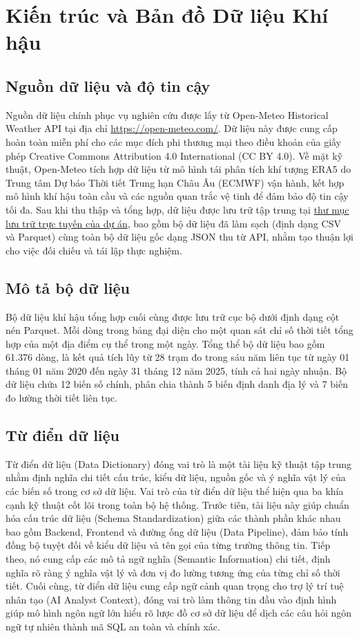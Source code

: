 \chapter{Kiến trúc và Bản đồ Dữ liệu Khí hậu}

\section{Nguồn dữ liệu và độ tin cậy}
Nguồn dữ liệu chính phục vụ nghiên cứu được lấy từ Open-Meteo Historical Weather API tại địa chỉ \url{https://open-meteo.com/}. Dữ liệu này được cung cấp hoàn toàn miễn phí cho các mục đích phi thương mại theo điều khoản của giấy phép Creative Commons Attribution 4.0 International (CC BY 4.0). Về mặt kỹ thuật, Open-Meteo tích hợp dữ liệu từ mô hình tái phân tích khí tượng ERA5 do Trung tâm Dự báo Thời tiết Trung hạn Châu Âu (ECMWF) vận hành, kết hợp mô hình khí hậu toàn cầu và các nguồn quan trắc vệ tinh để đảm bảo độ tin cậy tối đa. Sau khi thu thập và tổng hợp, dữ liệu được lưu trữ tập trung tại \href{https://drive.google.com/drive/folders/1CctfwMHv8zrezlzuVUq7foVr1sAQaxJL}{thư mục lưu trữ trực tuyến của dự án}, bao gồm bộ dữ liệu đã làm sạch (định dạng CSV và Parquet) cùng toàn bộ dữ liệu gốc dạng JSON thu từ API, nhằm tạo thuận lợi cho việc đối chiếu và tái lập thực nghiệm.

\section{Mô tả bộ dữ liệu}
Bộ dữ liệu khí hậu tổng hợp cuối cùng được lưu trữ cục bộ dưới định dạng cột nén Parquet. Mỗi dòng trong bảng đại diện cho một quan sát chỉ số thời tiết tổng hợp của một địa điểm cụ thể trong một ngày. Tổng thể bộ dữ liệu bao gồm 61.376 dòng, là kết quả tích lũy từ 28 trạm đo trong sáu năm liên tục từ ngày 01 tháng 01 năm 2020 đến ngày 31 tháng 12 năm 2025, tính cả hai ngày nhuận. Bộ dữ liệu chứa 12 biến số chính, phân chia thành 5 biến định danh địa lý và 7 biến đo lường thời tiết liên tục.

\section{Từ điển dữ liệu}
Từ điển dữ liệu (Data Dictionary) đóng vai trò là một tài liệu kỹ thuật tập trung nhằm định nghĩa chi tiết cấu trúc, kiểu dữ liệu, nguồn gốc và ý nghĩa vật lý của các biến số trong cơ sở dữ liệu. Vai trò của từ điển dữ liệu thể hiện qua ba khía cạnh kỹ thuật cốt lõi trong toàn bộ hệ thống. Trước tiên, tài liệu này giúp chuẩn hóa cấu trúc dữ liệu (Schema Standardization) giữa các thành phần khác nhau bao gồm Backend, Frontend và đường ống dữ liệu (Data Pipeline), đảm bảo tính đồng bộ tuyệt đối về kiểu dữ liệu và tên gọi của từng trường thông tin. Tiếp theo, nó cung cấp các mô tả ngữ nghĩa (Semantic Information) chi tiết, định nghĩa rõ ràng ý nghĩa vật lý và đơn vị đo lường tương ứng của từng chỉ số thời tiết. Cuối cùng, từ điển dữ liệu cung cấp ngữ cảnh quan trọng cho trợ lý trí tuệ nhân tạo (AI Analyst Context), đóng vai trò làm thông tin đầu vào định hình giúp mô hình ngôn ngữ lớn hiểu rõ lược đồ cơ sở dữ liệu để dịch các câu hỏi ngôn ngữ tự nhiên thành mã SQL an toàn và chính xác.

